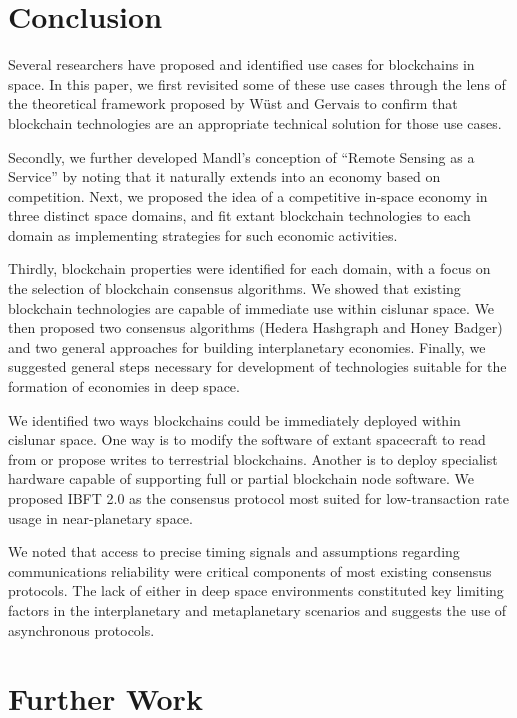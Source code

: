 \documentclass[journal ]{new-aiaa}
\begin{document}
\section{Conclusion}

Several researchers have proposed and identified use cases for blockchains in space. In this paper, we first revisited some of these use cases through the lens of the theoretical framework proposed by  W\"{u}st and Gervais\cite{wust_gervais_2017} to confirm that blockchain technologies are an appropriate technical solution for those use cases.

Secondly, we further developed Mandl's conception of ``Remote Sensing as a Service'' by noting that it naturally extends into an economy based on competition. Next, we proposed the idea of a competitive in-space economy in three distinct space domains, and fit extant blockchain technologies to each domain as implementing strategies for such economic activities.

Thirdly, blockchain properties were identified for each domain, with a focus on the selection of blockchain consensus algorithms. We showed that existing blockchain technologies are capable of immediate use within cislunar space. We then proposed two consensus algorithms (Hedera Hashgraph and Honey Badger) and two general approaches for building interplanetary economies. Finally, we suggested general steps necessary for development of technologies suitable for the formation of economies in deep space.

We identified two ways blockchains could be immediately deployed within cislunar space. One way is to modify the software of extant spacecraft to read from or propose writes to terrestrial blockchains. Another is to deploy specialist hardware capable of supporting full or partial blockchain node software. We proposed IBFT 2.0 as the consensus protocol most suited for low-transaction rate usage in near-planetary space.

We noted that access to precise timing signals and assumptions regarding communications reliability were critical components of most existing consensus protocols. The lack of either in deep space environments constituted key limiting factors in the interplanetary and metaplanetary scenarios and suggests the use of asynchronous protocols.



\section{Further Work}
\end{document}
